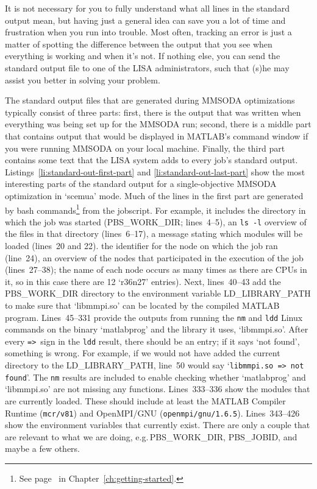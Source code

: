 It is not necessary for you to fully understand what all lines in the standard output mean, but having just a general idea can save you a lot of time and frustration when you run into trouble. Most often, tracking an error is just a matter of spotting the difference between the output that you see when everything is working and when it's not. If nothing else, you can send the standard output file to one of the LISA administrators, such that (s)he may assist you better in solving your problem.

The standard output files that are generated during MMSODA optimizations typically consist of three parts: first, there is the output that was written when everything was being set up for the MMSODA run; second, there is a middle part that contains output that would be displayed in MATLAB's command window if you were running MMSODA on your local machine. Finally, the third part contains some text that the LISA system adds to every job's standard output. Listings~\ref{li:standard-out-first-part} and \ref{li:standard-out-last-part} show the most interesting parts of the standard output for a single-objective MMSODA optimization in `scemua' mode. Much of the lines in the first part are generated by bash commands\footnote{See page~\pageref{word:bash} in Chapter~\ref{ch:getting-started}.} from the jobscript. For example, it includes the directory in which the job was started (PBS\_WORK\_DIR; lines~4--5), an \texttt{ls -l} overview of the files in that directory (lines~6--17), a message stating which modules will be loaded (lines~20 and 22).
the identifier for the node on which the job ran (line~24), an overview of the nodes that participated in the execution of the job (lines~27--38); the name of each node occurs as many times as there are CPUs in it, so in this case there are 12 `r36n27' entries).
Next, lines~40--43 add the PBS\_WORK\_DIR directory to the environment variable LD\_LIBRARY\_PATH to make sure that `libmmpi.so' can be located by the compiled MATLAB program. Lines~45--331 provide the outputs from running the \texttt{nm} and \texttt{ldd} Linux commands on the binary `matlabprog' and the library it uses, `libmmpi.so'. After every \texttt{=>}~sign in the \texttt{ldd} result, there should be an entry; if it says `not found', something is wrong. For example, if we would not have added the current directory to the LD\_LIBRARY\_PATH, line~50 would say `\texttt{libmmpi.so => not found}'. The \texttt{nm} results are included to enable checking whether `matlabprog' and `libmmpi.so' are not missing any functions. Lines~333--336 show the modules that are currently loaded. These should include at least the MATLAB Compiler Runtime (\texttt{mcr/v81}) and OpenMPI/GNU (\texttt{openmpi/gnu/1.6.5}). Lines~343--426 show the environment variables that currently exist. There are only a couple that are relevant to what we are doing, e.g.\,PBS\_WORK\_DIR, PBS\_JOBID, and maybe a few others.

